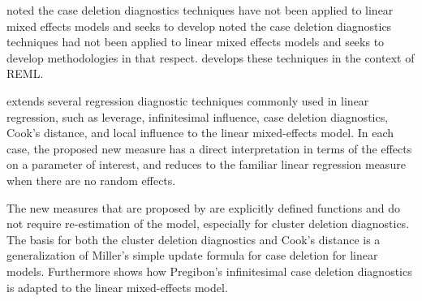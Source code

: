 \documentclass[12pt, a4paper]{article}
\begin{document}
			\citet{Christiansen} noted the case deletion diagnostics techniques have not been applied to linear mixed effects models and seeks to develop 
			\citet{CPJ} noted the case deletion diagnostics techniques had not been applied to linear mixed effects models and seeks to develop methodologies in that respect. \citet{CPJ} develops these techniques in the context of REML.
			
			
			
			
			\citet{Demi} extends several regression diagnostic techniques commonly used in linear regression, such as leverage, infinitesimal influence, case deletion diagnostics, Cook's distance, and local influence to the linear mixed-effects model. In each case, the proposed new measure has a direct interpretation in terms of the effects on a parameter of interest, and reduces to the familiar linear regression measure when there are no random effects. 
			
			The new measures that are proposed by \citet{Demi} are explicitly defined functions and do not require re-estimation of the model, especially for cluster deletion diagnostics. The basis for both the cluster deletion diagnostics and Cook's distance is a generalization of Miller's simple update formula for case deletion for linear models. Furthermore \citet{Demi} shows how Pregibon's infinitesimal case deletion diagnostics is adapted to the linear mixed-effects model. 
			
			
			
\end{document}
